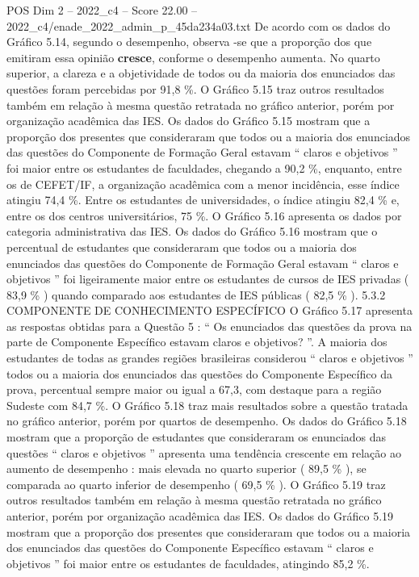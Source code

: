 \begin{textsample}{POS Dim 2 – 2022\_c4 – Score 22.00 – 2022\_c4/enade\_2022\_admin\_p\_45da234a03.txt}
De acordo com os dados do Gráfico 5.14, segundo o desempenho, observa -se que a proporção dos que emitiram essa opinião \textbf{cresce}, conforme o desempenho aumenta.
No quarto superior, a clareza e a objetividade de todos ou da maioria dos enunciados das questões foram percebidas por 91,8 \%.
O Gráfico 5.15 traz outros resultados também em relação à mesma questão retratada no gráfico anterior, porém por organização acadêmica das IES.
Os dados do Gráfico 5.15 mostram que a proporção dos presentes que consideraram que todos ou a maioria dos enunciados das questões do Componente de Formação Geral estavam “ claros e objetivos ” foi maior entre os estudantes de faculdades, chegando a 90,2 \%, enquanto, entre os de CEFET/IF, a organização acadêmica com a menor incidência, esse índice atingiu 74,4 \%.
Entre os estudantes de universidades, o índice atingiu 82,4 \% e, entre os dos centros universitários, 75 \%.
O Gráfico 5.16 apresenta os dados por categoria administrativa das IES.
Os dados do Gráfico 5.16 mostram que o percentual de estudantes que consideraram que todos ou a maioria dos enunciados das questões do Componente de Formação Geral estavam “ claros e objetivos ” foi ligeiramente maior entre os estudantes de cursos de IES privadas ( 83,9 \% ) quando comparado aos estudantes de IES públicas ( 82,5 \% ). 5.3.2 COMPONENTE DE CONHECIMENTO ESPECÍFICO O Gráfico 5.17 apresenta as respostas obtidas para a Questão 5 : “ Os enunciados das questões da prova na parte de Componente Específico estavam claros e objetivos? ”.
A maioria dos estudantes de todas as grandes regiões brasileiras considerou “ claros e objetivos ” todos ou a maioria dos enunciados das questões do Componente Específico da prova, percentual sempre maior ou igual a 67,3, com destaque para a região Sudeste com 84,7 \%.
O Gráfico 5.18 traz mais resultados sobre a questão tratada no gráfico anterior, porém por quartos de desempenho.
Os dados do Gráfico 5.18 mostram que a proporção de estudantes que consideraram os enunciados das questões “ claros e objetivos ” apresenta uma tendência crescente em relação ao aumento de desempenho : mais elevada no quarto superior ( 89,5 \% ), se comparada ao quarto inferior de desempenho ( 69,5 \% ).
O Gráfico 5.19 traz outros resultados também em relação à mesma questão retratada no gráfico anterior, porém por organização acadêmica das IES.
Os dados do Gráfico 5.19 mostram que a proporção dos presentes que consideraram que todos ou a maioria dos enunciados das questões do Componente Específico estavam “ claros e objetivos ” foi maior entre os estudantes de faculdades, atingindo 85,2 \%.

\end{textsample}
